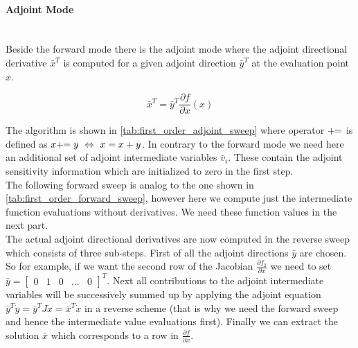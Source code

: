 \documentclass{scrartcl}[12pt, halfparskip]
\numberwithin{equation}{section}
\numberwithin{figure}{section}
\numberwithin{table}{section}
\begin{document}
\paragraph{Adjoint Mode}\mbox{}\\
Beside the forward mode there is the adjoint mode where the adjoint directional derivative $\bar{x}^T$ is computed for a given adjoint direction $\bar{y}^T$ at the evaluation point $x$. 

\begin{equation}
\bar{x}^T = \bar{y}^T \frac{\partial f}{\partial x}(x)
\end{equation}

The algorithm is shown in \cref{tab:first_order_adjoint_sweep} where operator $+ \hspace{-0.12cm} =$ is defined as $x + \hspace{-0.12cm} = y \ \Leftrightarrow \ x = x + y$. In contrary to the forward mode we need here an additional set of adjoint intermediate variables $\bar{v}_i$. These contain the adjoint sensitivity information which are initialized to zero in the first step. \\
The following forward sweep is analog to the one shown in \cref{tab:first_order_forward_sweep}, however here we compute just the intermediate function evaluations without derivatives. We need these function values in the next part. \\
The actual adjoint directional derivatives are now computed in the reverse sweep which consists of three sub-steps. First of all the adjoint directions $\bar{y}$ are chosen. So for example, if we want the second row of the Jacobian $\frac{\partial f_2}{\partial x}$ we need to set $\bar{y} = \begin{bmatrix}
0 & 1 & 0 & \dots & 0
\end{bmatrix}^T$.
Next all contributions to the adjoint intermediate variables will be successively summed up by applying the adjoint equation $\bar{y}^T \dot{y} = \bar{y}^T J \dot{x} = \bar{x}^T \dot{x}$ in a reverse scheme (that is why we need the forward sweep and hence the intermediate value evaluations first). Finally we can extract the solution $\bar{x}$ which corresponds to a row in $\frac{\partial f}{\partial x}$.
\end{document}
